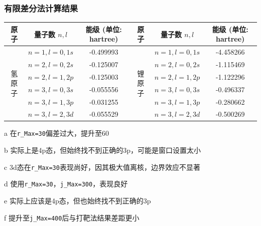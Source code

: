     \subsubsection{有限差分法计算结果}
    \begin{threeparttable}
        \begin{tabular}{|c|c|c|c|c|c|}
        \hline
        原子 & 量子数 \(n, l\) & 能级 (单位: hartree) & 原子 & 量子数 \(n, l\) & 能级 (单位: hartree) \\ \hline
        \multirow{6}{*}{氢原子} & \(n=1, l=0, 1s\) & -0.499993 & \multirow{6}{*}{锂原子} & \(n=1, l=0, 1s\) & -4.458266\tnote{d} \\ \cline{2-3} \cline{5-6}
                                & \(n=2, l=0, 2s\) & -0.125007 &                      & \(n=2, l=0, 2s\) & -1.115469 \\ \cline{2-3} \cline{5-6}
                                & \(n=2, l=1, 2p\) & -0.125003 &                      & \(n=2, l=1, 2p\) & -1.122296 \\ \cline{2-3} \cline{5-6}
                                & \(n=3, l=0, 3s\) & -0.055556\tnote{a} &                      & \(n=3, l=0, 3s\) & -0.496337 \\ \cline{2-3} \cline{5-6}
                                & \(n=3, l=1, 3p\) & -0.031255\tnote{b} &                      & \(n=3, l=1, 3p\) & -0.280662\tnote{e} \\ \cline{2-3} \cline{5-6}
                                & \(n=3, l=2, 3d\) & -0.055529\tnote{c}&                      & \(n=3, l=2, 3d\) & -0.500269\tnote{f} \\ \hline
        \end{tabular}
        \begin{tablenotes}
        \item[a] 在\texttt{r\_Max=30}偏差过大，提升至60
        \item[b] 实际上是4p态，但始终找不到正确的3p，可能是窗口设置太小
        \item[c] 3d态在\texttt{r\_Max=30}表现尚好，因其极大值离核，边界效应不显著
        \item[d] 使用\texttt{r\_Max=30}，\texttt{j\_Max=300}，表现良好 
        \item[e] 实际上应该是4p态，但也始终找不到正确的3p
        \item[f] 提升至\texttt{j\_Max=400}后与打靶法结果差距更小
        \end{tablenotes}
        \end{threeparttable}

